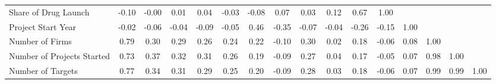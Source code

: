 {\begin{tabular}{l*{15}{c}}
Share of Drug Launch&    -0.10&    -0.00&     0.01&     0.04&    -0.03&    -0.08&     0.07&     0.03&     0.12&     0.67&     1.00&         &         &         &         \\
Project Start Year&    -0.02&    -0.06&    -0.04&    -0.09&    -0.05&     0.46&    -0.35&    -0.07&    -0.04&    -0.26&    -0.15&     1.00&         &         &         \\
Number of Firms &     0.79&     0.30&     0.29&     0.26&     0.24&     0.22&    -0.10&     0.30&     0.02&     0.18&    -0.06&     0.08&     1.00&         &         \\
Number of Projects Started&     0.73&     0.37&     0.32&     0.31&     0.26&     0.19&    -0.09&     0.27&     0.04&     0.17&    -0.05&     0.07&     0.98&     1.00&         \\
Number of Targets&     0.77&     0.34&     0.31&     0.29&     0.25&     0.20&    -0.09&     0.28&     0.03&     0.18&    -0.06&     0.07&     0.99&     0.99&     1.00\\
\hline\hline
\end{tabular}
}

